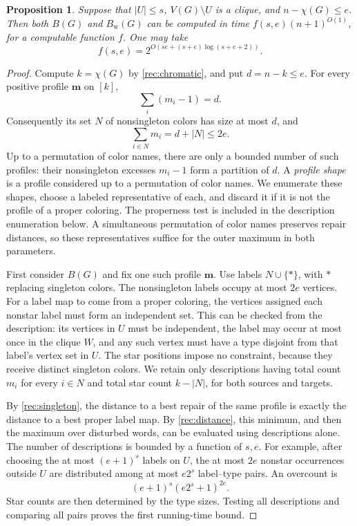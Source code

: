 \documentclass[11pt,reqno]{amsart}
\numberwithin{equation}{section}
\newtheorem{proposition}[theorem]{Proposition}
\theoremstyle{definition}
\theoremstyle{remark}
\begin{document}
\begin{proposition}\label{rec:cocover}
Suppose that $|U|\leq s$, $V(G)\setminus U$ is a clique, and
$n-\chi(G)\leq e$. Then both $B(G)$ and $B_{\mathrm w}(G)$ can
be computed in time $f(s,e)(n+1)^{O(1)}$, for a computable function $f$.
One may take
\[
f(s,e)=2^{O(se+(s+e)\log(s+e+2))}.
\]
\end{proposition}
\begin{proof}
Compute $k=\chi(G)$ by \cref{rec:chromatic}, and put
$d=n-k\leq e$. For every positive profile $\mathbf m$ on $[k]$,
\[
\sum_i(m_i-1)=d.
\]
Consequently its set $N$ of nonsingleton colors has size at most
$d$, and
\[
\sum_{i\in N}m_i=d+|N|\leq2e.
\]
Up to a permutation of color names, there are only a bounded number
of such profiles: their nonsingleton excesses $m_i-1$ form a
partition of $d$. A \emph{profile shape} is a profile considered up
to a permutation of color names. We enumerate these shapes, choose a
labeled representative of each, and discard it if it is not the
profile of a proper coloring. The properness test is included in
the description enumeration below. A simultaneous permutation of
color names preserves repair distances, so these representatives
suffice for the outer maximum in both parameters.

First consider $B(G)$ and fix one such profile $\mathbf m$.
Use labels $N\cup\{*\}$, with $*$ replacing singleton colors.
The nonsingleton labels occupy at most $2e$ vertices. For a label
map to come from a proper coloring, the vertices assigned each
nonstar label must form an independent set. This can be checked from
the description: its vertices in $U$ must be independent, the label
may occur at most once in the clique $W$, and any such vertex must have a type
disjoint from that label's vertex set in $U$. The star positions impose no
constraint, because they receive distinct singleton colors.
We retain only descriptions having total count $m_i$ for every
$i\in N$ and total star count $k-|N|$, for both sources and targets.

By \cref{rec:singleton}, the distance to a best repair of the
same profile is exactly the distance to a best proper label map.
By \cref{rec:distance}, this minimum, and then the maximum
over disturbed words, can be evaluated using descriptions alone.
The number of descriptions is bounded by a function of $s,e$.
For example, after choosing the at most $(e+1)^s$ labels on $U$,
the at most $2e$ nonstar occurrences outside $U$ are distributed
among at most $e2^s$ label--type pairs. An overcount is
\[
(e+1)^s(e2^s+1)^{2e}.
\]
Star counts are then determined by the type sizes. Testing all
descriptions and comparing all pairs proves the first running-time
bound.


\end{proof}
\end{document}
